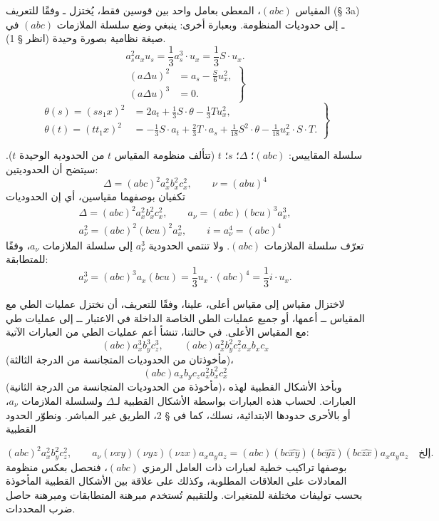 \documentclass[11pt]{article}
\begin{document}
المقياس $(abc)$، المعطى بعامل واحد بين قوسين فقط، يُختزل ـ وفقًا للتعريف (§ 3a) ـ إلى حدوديات المنظومة. وبعبارة أخرى: ينبغي وضع سلسلة الملازمات $(abc)$ في صيغة نظامية بصورة وحيدة (انظر § 1).
\[
a_s^2a_xu_s=\frac13a_s^3\cdot u_x=\frac13S\cdot u_x. \tag{2.}
\]
\[
\left.
\begin{aligned}
(a\Delta u)^2&=a_s-\frac{S}{6}u_x^2,\\
(a\Delta u)^3&=0.
\end{aligned}
\right\} \tag{3.}
\]
\[
\left.
\begin{aligned}
\theta(s)=(ss_1x)^2&=2a_t+\frac13S\cdot\theta-\frac13Tu_x^2,\\
\theta(t)=(tt_1x)^2&=-\frac13S\cdot a_t+\frac23T\cdot a_s+\frac1{18}S^2\cdot\theta-\frac1{18}u_x^2\cdot S\cdot T.
\end{aligned}
\right\} \tag{4.}
\]

سلسلة المقاييس: $(abc)$؛ $\Delta$؛ $s$؛ $t$ (تتألف منظومة المقياس $t$ من الحدودية الوحيدة $t$).
سيتضح أن الحدوديتين:
\[
\Delta=(abc)^2a_x^2b_x^2c_x^2,\qquad \nu=(abu)^4
\]
تكفيان بوصفهما مقياسين، أي إن الحدوديات
\[
\begin{gathered}
\Delta=(abc)^2a_x^2b_x^2c_x^2,
\qquad a_\nu=(abc)(bcu)^3a_x^3,\\
a_\nu^2=(abc)^2(bcu)^2a_x^2,
\qquad i=a_\nu^4=(abc)^4
\end{gathered}
\]
تعرّف سلسلة الملازمات $(abc)$. ولا تنتمي الحدودية $a_\nu^3$ إلى سلسلة الملازمات $a_\nu$، وفقًا للمتطابقة:
\[
a_\nu^3=(abc)^3a_x(bcu)=\frac13u_x\cdot(abc)^4=\frac13i\cdot u_x.
\]

لاختزال مقياس إلى مقياس أعلى، علينا، وفقًا للتعريف، أن نختزل عمليات الطي مع المقياس ــ أعمها، أو جميع عمليات الطي الخاصة الداخلة في الاعتبار ــ إلى عمليات طي مع المقياس الأعلى.
في حالتنا، تنشأ أعم عمليات الطي من العبارات الآتية:
\[
(abc)a_x^3b_y^3c_z^3,
\qquad
(abc)a_x^2b_y^2c_z^2a_xb_xc_x
\]
(مأخوذتان من الحدوديات المتجانسة من الدرجة الثالثة)،
\[
(abc)a_xb_yc_za_x^2b_x^2c_x^2
\]
(مأخوذة من الحدوديات المتجانسة من الدرجة الثانية)، وبأخذ الأشكال القطبية لهذه العبارات.
لحساب هذه العبارات بواسطة الأشكال القطبية لـ$\Delta$ ولسلسلة الملازمات $a_\nu$، أو بالأحرى حدودها الابتدائية، نسلك، كما في § 2، الطريق غير المباشر. ونطوّر الحدود القطبية

\[
(abc)^2a_x^2b_y^2c_z^2,
\qquad
 a_\nu(\nu xy)(\nu yz)(\nu zx)a_xa_ya_z=(abc)(bc\widehat{xy})(bc\widehat{yz})(bc\widehat{zx})a_xa_ya_z\quad\text{إلخ.}
\]
بوصفها تراكيب خطية لعبارات ذات العامل الرمزي $(abc)$، فنحصل بعكس منظومة المعادلات على العلاقات المطلوبة، وكذلك على علاقة بين الأشكال القطبية المأخوذة بحسب توليفات مختلفة للمتغيرات. وللتقييم تُستخدم مبرهنة المتطابقات ومبرهنة حاصل ضرب المحددات.
\end{document}
